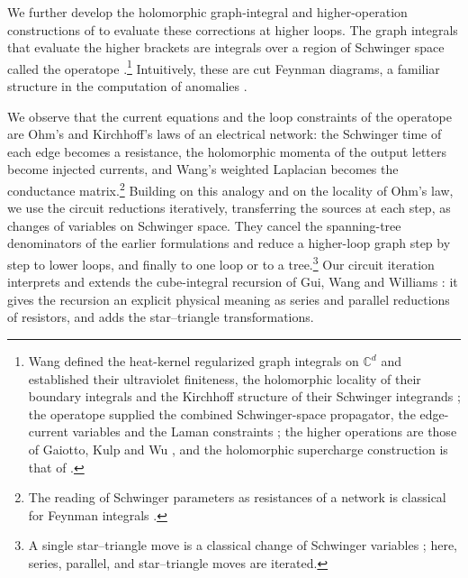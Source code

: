 \documentclass[11pt]{article}
\numberwithin{equation}{section}
\numberwithin{figure}{section}
\numberwithin{table}{section}
\begin{document}
We further develop the holomorphic graph-integral and higher-operation constructions of \cite{Wang,operatope,higher,BK} to evaluate these corrections at higher loops. The graph integrals that evaluate the higher brackets are integrals over a region of Schwinger space called the operatope \cite{operatope}.\footnote{Wang defined the heat-kernel regularized graph integrals on $\mathbb C^d$ and established their ultraviolet finiteness, the holomorphic locality of their boundary integrals and the Kirchhoff structure of their Schwinger integrands \cite[Sections 2--4]{Wang}; the operatope supplied the combined Schwinger-space propagator, the edge-current variables and the Laman constraints \cite[Section 2]{operatope}; the higher operations are those of Gaiotto, Kulp and Wu \cite{higher}, and the holomorphic supercharge construction is that of \cite{semichiral,BK}.} Intuitively, these are cut Feynman diagrams, a familiar structure in the computation of anomalies \cite{Wang,BK}.

We observe that the current equations and the loop constraints of the operatope \cite[Equations (2.26), (2.31), (2.33)]{operatope} are Ohm's and Kirchhoff's laws of an electrical network: the Schwinger time of each edge becomes a resistance, the holomorphic momenta of the output letters become injected currents, and Wang's weighted Laplacian \cite[Definition 12, Remark 6]{Wang} becomes the conductance matrix.\footnote{The reading of Schwinger parameters as resistances of a network is classical for Feynman integrals \cite{Mathews,PSS}.} Building on this analogy and on the locality of Ohm's law, we use the circuit reductions iteratively, transferring the sources at each step, as changes of variables on Schwinger space. They cancel the spanning-tree denominators of the earlier formulations and reduce a higher-loop graph step by step to lower loops, and finally to one loop or to a tree.\footnote{A single star--triangle move is a classical change of Schwinger variables \cite[Lemma 2.4.23]{Panzer}; here, series, parallel, and star--triangle moves are iterated.} Our circuit iteration interprets and extends the cube-integral recursion of Gui, Wang and Williams \cite[Theorem 4.13]{GWW}: it gives the recursion an explicit physical meaning as series and parallel reductions of resistors, and adds the star--triangle transformations.
\end{document}
